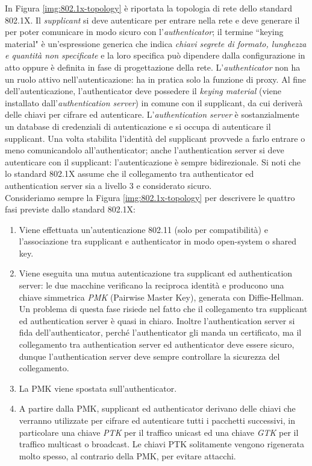 In Figura \ref{img:802.1x-topology} è riportata la topologia di rete dello standard 802.1X. Il \textit{supplicant} si deve autenticare per entrare nella rete e deve generare il  per poter comunicare in modo sicuro con l'\textit{authenticator}; il termine \textquotedblleft keying material" è un'espressione generica che indica \textit{chiavi segrete di formato, lunghezza e quantità non specificate} e la loro specifica può dipendere dalla configurazione in atto oppure è definita in fase di progettazione della rete. L'\textit{authenticator} non ha un ruolo attivo nell'autenticazione: ha in pratica solo la funzione di proxy. Al fine dell'autenticazione, l'authenticator deve possedere il \textit{keying material} (viene installato dall'\textit{authentication server}) in comune con il supplicant, da cui deriverà delle chiavi per cifrare ed autenticare. L'\textit{authentication server} è sostanzialmente un database di credenziali di autenticazione e si occupa di autenticare il supplicant. Una volta stabilita l'identità del supplicant provvede a farlo entrare o meno comunicandolo all'authenticator; anche l'authentication server si deve autenticare con il supplicant: l'autenticazione è sempre bidirezionale. Si noti che lo standard 802.1X assume che il collegamento tra authenticator ed authentication server sia a livello 3 e considerato sicuro.\\
Consideriamo sempre la Figura \ref{img:802.1x-topology} per descrivere le quattro fasi previste dallo standard 802.1X:
\begin{enumerate}
	\item Viene effettuata un'autenticazione 802.11 (solo per compatibilità) e l'associazione tra supplicant e authenticator in modo open-system o shared key.
	\item Viene eseguita una mutua autenticazione tra supplicant ed authentication server: le due macchine verificano la reciproca identità e producono una chiave simmetrica \textit{PMK} (Pairwise Master Key), generata con Diffie-Hellman. Un problema di questa fase risiede nel fatto che il collegamento tra supplicant ed authentication server è quasi in chiaro. Inoltre l'authentication server si fida dell'authenticator, perché l'authenticator gli manda un certificato, ma il collegamento tra authentication server ed authenticator deve essere sicuro, dunque l'authentication server deve sempre controllare la sicurezza del collegamento.
	\item La PMK viene spostata sull'authenticator.
	\item A partire dalla PMK, supplicant ed authenticator derivano delle chiavi che verranno utilizzate per cifrare ed autenticare tutti i pacchetti successivi, in particolare una chiave \textit{PTK} per il traffico unicast ed una chiave \textit{GTK} per il traffico multicast o broadcast. Le chiavi PTK solitamente vengono rigenerata molto spesso, al contrario della PMK, per evitare attacchi.
\end{enumerate}
